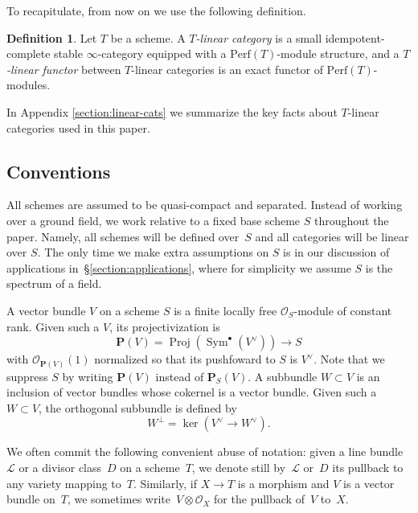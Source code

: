 \documentclass[11pt, reqno]{amsart}
\numberwithin{equation}{section}
\theoremstyle{plain}
\theoremstyle{definition}
\newtheorem{definition}[theorem]{Definition}
\newcommand{\Perf}{\mathrm{Perf}}
\newcommand{\svee}{\scriptscriptstyle\vee}
\DeclareMathOperator{\Sym}{Sym}
\DeclareMathOperator{\Proj}{Proj}
\newcommand{\cO}{\mathcal{O}}
\newcommand{\cL}{\mathcal{L}}
\newcommand{\bP}{\mathbf{P}}
\begin{document}
To recapitulate, from now on we use the following definition.

\begin{definition}
\label{definition-linear-category}
Let $T$ be a scheme. 
A \emph{$T$-linear category} is a small 
idempotent-complete stable $\infty$-category equipped with a $\Perf(T)$-module structure, 
and a \emph{$T$-linear functor} between $T$-linear categories 
is an exact functor of $\Perf(T)$-modules. 
\end{definition}

In Appendix \ref{section:linear-cats} we summarize the key facts about $T$-linear categories used in this paper. 

\subsection{Conventions} 
\label{subsection-conventions}

All schemes are assumed to be quasi-compact and separated. 
Instead of working over a ground field, we work relative to a fixed base scheme $S$ throughout the paper. 
Namely, all schemes will be defined over~$S$ and all categories will be linear over $S$. 
The only time we make extra assumptions on $S$ is in our discussion of applications 
in~\S\ref{section:applications}, where for simplicity 
we assume $S$ is the spectrum of a field.

A vector bundle $V$ on a scheme $S$ is a finite locally free $\cO_S$-module of constant rank.
Given such a $V$, its projectivization is 
\begin{equation*}
\bP(V) = \Proj(\Sym^\bullet(V^{\svee})) \to S
\end{equation*}
with $\cO_{\bP(V)}(1)$ normalized so that its pushfoward to $S$ is $V^{\svee}$. 
Note that we suppress $S$ by writing $\bP(V)$ instead of $\bP_S(V)$. 
A subbundle $W \subset V$ is an inclusion of vector bundles whose cokernel is a vector bundle. 
Given such a $W \subset V$, the orthogonal subbundle is defined by 
\begin{equation}
\label{eq:perp-bundle}
W^{\perp} = \ker(V^{\svee} \to W^{\svee}). 
\end{equation}

We often commit the following convenient abuse of notation: given a line bundle~$\cL$ or a divisor class~$D$ on a scheme~$T$, 
we denote still by~$\cL$ or~$D$ its pullback to any variety mapping to~$T$. 
Similarly, if $X \to T$ is a morphism and $V$ is a vector bundle on~$T$, we sometimes 
write~\mbox{$V \otimes \cO_X$} for the pullback of~$V$ to~$X$.
\end{document}
